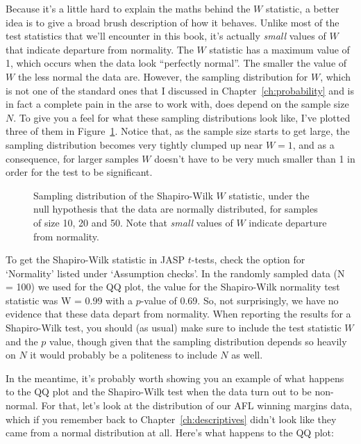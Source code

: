 Because it's a little hard to explain the maths behind the $W$ statistic, a better idea is to give a broad brush description of how it behaves. Unlike most of the test statistics that we'll encounter in this book, it's actually {\it small} values of $W$ that indicate departure from normality. The $W$ statistic has a maximum value of 1, which occurs when the data look ``perfectly normal''. The smaller the value of $W$ the less normal the data are. However, the sampling distribution for $W$, which is not one of the standard ones that I discussed in Chapter~\ref{ch:probability} and is in fact a complete pain in the arse to work with, does depend on the sample size $N$. To give you a feel for what these sampling distributions look like, I've plotted three of them in Figure~\ref{fig:swdist}. Notice that, as the sample size starts to get large, the sampling distribution becomes very tightly clumped up near $W=1$, and as a consequence, for larger samples $W$ doesn't have to be very much smaller than 1 in order for the test to be significant. 

\begin{figure}
\begin{center}
\caption{Sampling distribution of the Shapiro-Wilk $W$ statistic, under the null hypothesis that the data are normally distributed, for samples of size 10, 20 and 50. Note that {\it small} values of $W$ indicate departure from normality.}
\HR
\label{fig:swdist}
\end{center}
\end{figure}

To get the Shapiro-Wilk statistic in JASP $t$-tests, check the option for `Normality' listed under `Assumption checks'. In the randomly sampled data (N = 100) we used for the QQ plot, the value for the Shapiro-Wilk normality test statistic was W = 0.99 with a $p$-value of 0.69. So, not surprisingly, we have no evidence that these data depart from normality. When reporting the results for a Shapiro-Wilk test, you should (as usual) make sure to include the test statistic $W$ and the $p$ value, though given that the sampling distribution depends so heavily on $N$ it would probably be a politeness to include $N$ as well.


In the meantime, it's probably worth showing you an example of what happens to the QQ plot and the Shapiro-Wilk test when the data turn out to be non-normal. For that, let's look at the distribution of our AFL winning margins data, which if you remember back to Chapter~\ref{ch:descriptives} didn't look like they came from a normal distribution at all. Here's what happens to the QQ plot:

